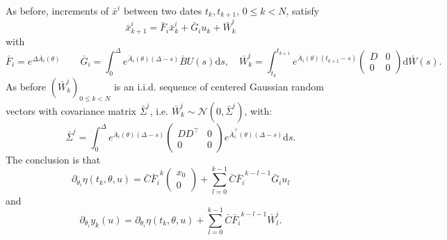 \documentclass[a4paper]{article}
\theoremstyle{definition}
\theoremstyle{remark}
\newcommand{\diff}{\mathrm{d}}
\begin{document}
As before, increments of $\bar x^i$ between two dates $t_{k},t_{k+1}$, $0\leq k<N$, satisfy
\begin{equation}\label{E:rec1}
\bar x^i_{k+1}=\bar F_i \bar x^i_k
+
\bar G_i u_k
+
\bar W^i_k
\end{equation}
with
\begin{equation}
\bar F_i=e^{\Delta \bar A_i(\theta)}
\qquad 
\bar G_i
= 
\int_{0}^{\Delta}e^{\bar A_i(\theta)(\Delta-s)}\bar BU(s)\diff s,
\quad
\bar W_k^i=\int_{t_k}^{t_{k+1}}e^{\bar A_i(\theta)(t_{k+1}-s)}\begin{pmatrix}
D & 0
\\
0 & 0
\end{pmatrix} \diff \bar W(s).
\end{equation}
As before $(\bar W_k^i)_{0\leq k<N}$ is an i.i.d. sequence of centered Gaussian random vectors with covariance matrix $\bar\Sigma^i$, i.e. $\bar W_k^i\sim \mathcal{N}(0,\bar\Sigma^i)$, with:
$$
\bar\Sigma^i = \int_0^\Delta e^{\bar A_i(\theta)(\Delta-s)}
\begin{pmatrix}
D D^\top  & 0
\\
0 & 0
\end{pmatrix} 
e^{\bar A_i^\top(\theta)(\Delta-s)}\diff s.
$$
The conclusion is that 
\begin{equation}\label{eq:deta_dtheta}
\partial_{\theta_i}\eta(t_k,\theta,u)
=
\bar C
{\bar F_i}^{k}
\begin{pmatrix}
x_0\\0
\end{pmatrix}
+
\sum_{l=0}^{k-1} 
\bar C
{\bar F_i}^{k-l-1}{\bar G_i}u_{l} 
\end{equation}
and
\begin{equation}\label{eq:dy_dtheta}
\partial_{\theta_i}y_k(u)
=\partial_{\theta_i}\eta(t_k,\theta,u)+\sum_{l=0}^{k-1} \bar C {\bar F_i}^{k-l-1}{\bar W^i_l}.
\end{equation}
\end{document}
